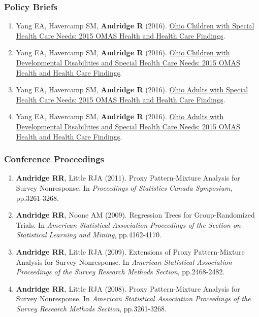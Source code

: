 \documentclass[
  english,
  letterpaper,
  DIV=11,
  numbers=noendperiod]{scrartcl}
\providecommand{\tightlist}{%
  \setlength{\itemsep}{0pt}\setlength{\parskip}{0pt}}
\begin{document}
\subsubsection{Policy Briefs}\label{policy-briefs}

\begin{enumerate}
\def\labelenumi{\arabic{enumi}.}
\tightlist
\item
  Yang EA, Havercamp SM, \textbf{Andridge R} (2016).
  \href{http://grc.osu.edu/sites/default/files/inline-files/ChildrenSHCNBriefFINAL.pdf}{Ohio
  Children with Special Health Care Needs: 2015 OMAS Health and Health
  Care Findings}.
\item
  Yang EA, Havercamp SM, \textbf{Andridge R} (2016).
  \href{http://grc.osu.edu/sites/default/files/inline-files/ChildrenDDBriefFINAL_1.pdf}{Ohio
  Children with Developmental Disabilities and Special Health Care
  Needs: 2015 OMAS Health and Health Care Findings}.
\item
  Yang EA, Havercamp SM, \textbf{Andridge R} (2016).
  \href{http://grc.osu.edu/sites/default/files/inline-files/AdultSHCNBriefFINAL.pdf}{Ohio
  Adults with Special Health Care Needs: 2015 OMAS Health and Health
  Care Findings}.
\item
  Yang EA, Havercamp SM, \textbf{Andridge R} (2016).
  \href{http://grc.osu.edu/sites/default/files/inline-files/AdultDDBriefFINAL.pdf}{Ohio
  Adults with Developmental Disabilities and Special Health Care Needs:
  2015 OMAS Health and Health Care Findings}.
\end{enumerate}

\subsubsection{Conference Proceedings}\label{conference-proceedings}

\begin{enumerate}
\def\labelenumi{\arabic{enumi}.}
\tightlist
\item
  \textbf{Andridge RR}, Little RJA (2011). Proxy Pattern-Mixture
  Analysis for Survey Nonresponse. In \emph{Proceedings of Statistics
  Canada Symposium}, pp.3261-3268.
\item
  \textbf{Andridge RR}, Noone AM (2009). Regression Trees for
  Group-Randomized Trials. In \emph{American Statistical Association
  Proceedings of the Section on Statistical Learning and Mining},
  pp.4162-4170.
\item
  \textbf{Andridge RR}, Little RJA (2009). Extensions of Proxy
  Pattern-Mixture Analysis for Survey Nonresponse. In \emph{American
  Statistical Association Proceedings of the Survey Research Methods
  Section}, pp.2468-2482.
\item
  \textbf{Andridge RR}, Little RJA (2008). Proxy Pattern-Mixture
  Analysis for Survey Nonresponse. In \emph{American Statistical
  Association Proceedings of the Survey Research Methods Section},
  pp.3261-3268.
\end{enumerate}
\end{document}
